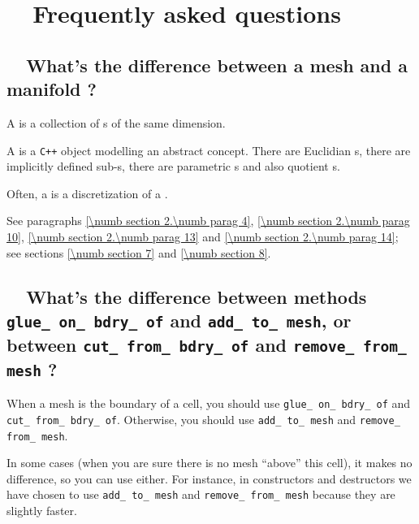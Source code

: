 
\chapter {~~{Frequently asked questions}}\label{\numb section 13}

\section{~~What's the difference between a mesh and a manifold ?}
\label{\numb section 13.\numb parag 1}

A {\small\tt{}} is a collection of {\small\tt{}}s of the
same dimension.

A {\small\tt{}} is a {\tt C++} object modelling an abstract concept.
There are Euclidian {\small\tt{}}s, there are implicitly defined
sub-{\small\tt{}}s, there are parametric {\small\tt{}}s
and also quotient {\small\tt{}}s.

Often, a {\small\tt{}} is a discretization of a {\small\tt{}}.

See paragraphs \ref{\numb section 2.\numb parag 4}, \ref{\numb section 2.\numb parag 10},
\ref{\numb section 2.\numb parag 13} and \ref{\numb section 2.\numb parag 14};
see sections \ref{\numb section 7} and \ref{\numb section 8}.


\section{~~What's the difference between methods {\small\tt glue\_\,on\_\,bdry\_\,of} and
  {\small\tt add\_\,to\_\,mesh}, or between {\small\tt cut\_\,from\_\,bdry\_\,of} and
  {\small\tt remove\_\,from\_\,mesh} ?}
\label{\numb section 13.\numb parag 2}

When a mesh is the boundary of a cell, you should use {\small\tt glue\_\,on\_\,bdry\_\,of} and
{\small\tt cut\_\,from\_\,bdry\_\,of}.
Otherwise, you should use {\small\tt add\_\,to\_\,mesh} and {\small\tt remove\_\,from\_\,mesh}.

In some cases (when you are sure there is no mesh ``above'' this cell), it makes no difference,
so you can use either.
For instance, in {\small\tt{}} constructors and destructors
we have chosen to use {\small\tt add\_\,to\_\,mesh} and {\small\tt remove\_\,from\_\,mesh}
because they are slightly faster.


